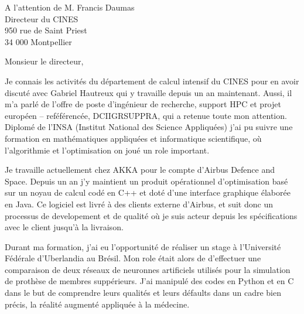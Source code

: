 \documentclass[12pt]{lettre}
\begin{document}
\begin{letter}{A l'attention de M. Francis Daumas\\Directeur du CINES\\950 rue de Saint Priest\\34 000 Montpellier}
\address{Victor Cameo Ponz\\16 rue Peyras\\31000 Toulouse}
\nofax

\opening{Monsieur le directeur,}

{
Je connais les activités du département de calcul intensif du CINES pour en
avoir discuté avec Gabriel Hautreux qui y travaille depuis un an
maintenant.
Aussi, il m'a parlé de l'offre de poste d'ingénieur de recherche,
support HPC et projet européen -- reféférencée, DCIIGRSUPPRA,
qui a retenue toute mon attention.
Diplomé de l'INSA (Institut National des Science Appliquées) j'ai pu suivre
une formation en mathématiques appliquées et informatique scientifique, où
l'algorithmie et l'optimisation on joué un role important. %
}

{
Je travaille
actuellement chez AKKA pour le compte d'Airbus Defence and Space.
Depuis un an j'y maintient un produit opérationnel d'optimisation
basé sur un noyau de calcul codé en C++ et doté d'une interface graphique élaborée en Java.
Ce logiciel est livré à des clients externe d'Airbus, et suit donc un
processus de developement et de qualité où
je suis acteur depuis les spécifications avec le client jusqu'à la livraison.


Durant ma formation, j'ai eu l'opportunité de réaliser un stage à
l'Université Fédérale d'Uberlandia au Brésil.
Mon role était alors de d'effectuer une comparaison de deux réseaux de neuronnes artificiels utilisés pour la simulation de prothèse de membres suppérieurs.
J'ai manipulé des codes en Python et en C dans le but de comprendre leurs
qualités et leurs défaults dans un cadre bien précis, la réalité augmenté
appliquée à la médecine. %


}
\end{letter}
\end{document}
